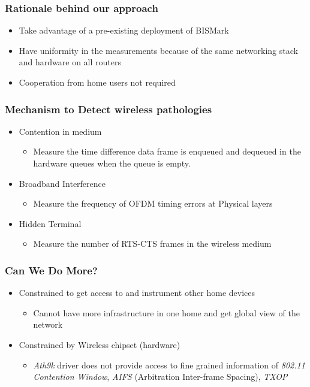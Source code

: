 \documentclass{beamer}
\begin{document}
\begin{frame}
  \frametitle{Rationale behind our approach} 
    \begin{itemize}
    \item Take advantage of a pre-existing deployment of BISMark
    \item Have uniformity in the measurements because of the same networking stack and hardware on all routers
    \item Cooperation from home users not required
    \end{itemize}
\end{frame}

\begin{frame}
  \frametitle{Mechanism to Detect wireless pathologies}
  \begin{itemize}
  \item Contention in medium
    \begin{itemize}
    \item Measure the time difference data frame is enqueued and
      dequeued in the hardware queues when the queue is empty.
    \end{itemize}
  \item Broadband Interference
    \begin{itemize}
       \item Measure the frequency of OFDM timing errors at Physical
         layers 
    \end{itemize}
  \item Hidden Terminal
    \begin{itemize}
    \item Measure the number of RTS-CTS frames in the wireless medium
    \end{itemize}
  \end{itemize}
\end{frame}


\begin{frame}
  \frametitle{Can We Do More?}
    \begin{itemize} 
    \item Constrained to get access to and instrument other home devices 
      \begin{itemize}
      \item Cannot have more infrastructure in one home and get global view of the network
      \end{itemize}
    \item Constrained by Wireless chipset (hardware)
      \begin{itemize} 
      \item \textit{Ath9k} driver does not provide access to fine grained information of \textit{802.11 Contention Window}, \textit{AIFS} (Arbitration Inter-frame Spacing), \textit{TXOP}
      \end{itemize}
    \end{itemize}
\end{frame}
\end{document}
